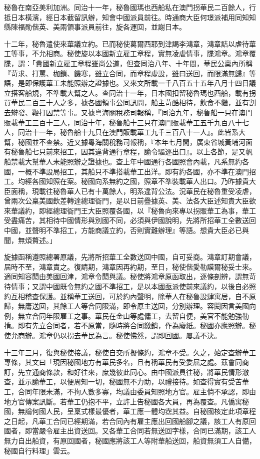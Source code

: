 \begin{pinyinscope}
秘魯在南亞美利加洲。同治十一年，秘魯國瑪也西船私在澳門拐華民二百餘人，行抵日本橫濱，經日本截留訊辦，知會中國派員前往。時通商大臣何璟派補用同知知縣陳福勛偕英、美兩領事派員前往，旋各運回，並謝日本。

十二年，秘魯遣使來華議立約。已而秘使葛爾西耶到津謁李鴻章，鴻章詰以虐待華工等事，不允相商。秘使旋以本國新立雇工章程，實無凌虐情事，牒鴻章。鴻章覆牒，謂：「貴國新立雇工章程雖尚公道，但查同治八年、十年間，華民公稟內所稱『苛求、打罵、枷鎖、饑寒，雖立合同，而章程虛設，雖曰送回，而限滿無歸』等語，是即保護華工未能照辦之證據也。又來文所載一千八百五十五年八月十四日議立搭客船規，不準載大幫之人。查同治十一年，日本國扣留秘魯瑪也西船，載有拐買華民二百三十人之多，據各國領事公同訊問，船主苛酷相待，飲食不繼，並有割去辮發、鞭打囚禁等事。又據粵海關稅務司報稱，『同治九年，秘魯船一只在澳門販載華工三百十三人，同治十年，秘魯船十三只在澳門販載華工五千九百八十七人，同治十一年，秘魯船十九只在澳門販載華工九千三百八十一人』。此皆系大幫，秘國並不查禁。近又據粵海關稅務司報稱，『本年七月間，廣東省城黃埔河面有秘魯船七只前來招工，因其違背通行章程，諭令驅逐出口』。以上各節，是又帆船禁載大幫華人未能照辦之證據也。查上年中國通行各國照會內載，凡系無約各國，一概不準設局招工，其船只不準搭載華工出洋。即有約各國，亦不準在澳門招工。均經各國知照在案。秘國向系無約之國，照章不準裝載華人出口。乃昨據貴大臣面稱，現載往秘魯華人已有十萬餘人，明系違背公法。況華民在秘魯重受凌虐，曾兩次公稟美國欽差轉達總理衙門，是以日前疊據英、美、法各大臣述知貴大臣欲來華議約，即經總理衙門王大臣照覆各國，以『秘魯向來專以拐販華工為事，華工受盡痛苦，其相待中國情形與別國不同，必須與伊國說明，先將所招華工全數送回中國，並聲明不準招工，方能商議立約，否則實難辦理』等語。想貴大臣必已與聞，無煩贅述。」

旋據函稱遵照總署原議，先將所招華工全數送回中國，自可妥商。鴻章訂期會議，屆時不至，鴻章責之。復請期，鴻章因再約期，至日，秘使偕愛勒謨爾秘妥士來。適同知容閎由美國回津，鴻章令閎與議。秘使將鴻章原函取出，逐條剖辨，謂無苛待情事；又謂中國既令無約之國不準招工，是以本國亟派使前來議約，以後自必照約互相稽查保護。並稱華工送回，可於約內聲明，除華人在秘魯設肆寓居，自不原歸，無庸送回，其餘工人等合同限滿，即令原主送回，分別辦理。容閎因言美國向例，無立合同年限雇工之事。華民在金山等處傭工，去留自便，美官不能勉強勒掯。即有先立合同者，若不原當，隨時將合同繳銷，作為廢紙。秘國亦應照辦。秘使允商辦。鴻章仍以拐去華民為言。秘使怫然，謂即回國。屢議不決。

十三年三月，復與秘使接議，秘使自交所擬條約，鴻章不受。久之，始定查辦華工專條，其文曰「現因秘國地方有華民多名，且有稱華民有受委屈之處。茲會同商訂，先立通商條款，和好往來，庶幾彼此同心。由中國派員往秘，將華民情形澈查，並示諭華工，以便周知一切，秘國無不力助，以禮接待。如查得實有受苦華工，合同年限未滿，不拘人數多寡，均議由委員知照地方官。雇主倘不承認，即由地方官傳案訊斷。若華工仍抱不平，立許上告秘國各大員，再為覆查。凡僑寓秘國，無論何國人民，呈稟式樣最優者，華工應一體均霑其益。自秘國核定此項章程之日起，凡華工合同已經期滿，若合同內有雇主應出回國船腳之議，該工人有原回國者，即當嚴令雇主出資送回。又各華工合同若無送回字樣，合同已滿期，該工人無力自出船資，有原回國者，秘國應將該工人等附華船送回，船資無須工人自備，秘國自行料理」雲云。


\end{pinyinscope}
